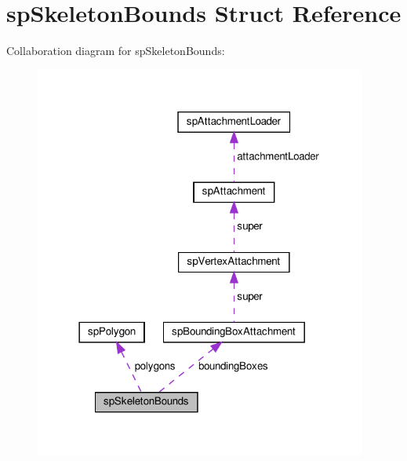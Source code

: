 \hypertarget{structspSkeletonBounds}{}\section{sp\+Skeleton\+Bounds Struct Reference}
\label{structspSkeletonBounds}


Collaboration diagram for sp\+Skeleton\+Bounds\+:
\nopagebreak
\begin{figure}[H]
\begin{center}
\leavevmode
\includegraphics[width=310pt]{structspSkeletonBounds__coll__graph}
\end{center}
\end{figure}
